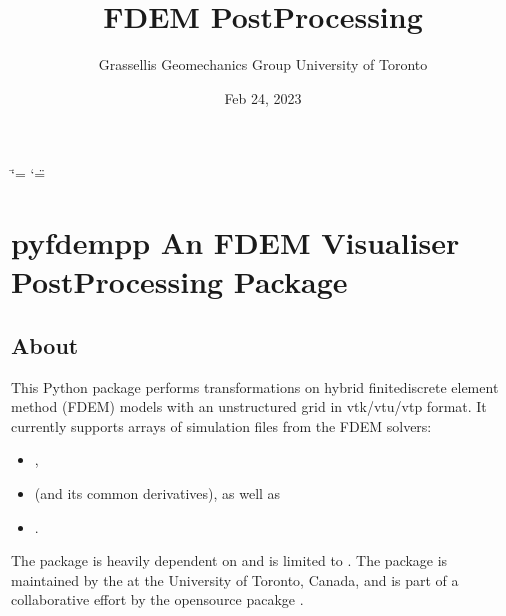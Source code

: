 \documentclass[letterpaper,10pt,english]{sphinxmanual}
\title{FDEM Post\sphinxhyphen{}Processing}
\date{Feb 24, 2023}
\author{Grasselli\textquotesingle{}s Geomechanics Group \sphinxhyphen{} University of Toronto}
\begin{document}
\ifdefined\shorthandoff
  \ifnum\catcode`\=\string=\active\shorthandoff{=}\fi
  \ifnum\catcode`\"=\active{}\fi
\fi

\pagestyle{empty}
\sphinxmaketitle
\pagestyle{plain}
\sphinxtableofcontents
\pagestyle{normal}
\label{\detokenize{index::doc}}


\sphinxstepscope


\chapter{pyfdempp \sphinxhyphen{} An FDEM Visualiser Post\sphinxhyphen{}Processing Package}
\label{\detokenize{postprocessing_intro:pyfdempp-an-fdem-visualiser-post-processing-package}}\label{\detokenize{postprocessing_intro::doc}}
\sphinxAtStartPar
{}


\section{About}
\label{\detokenize{postprocessing_intro:about}}
\sphinxAtStartPar
This Python package performs transformations on hybrid finite\sphinxhyphen{}discrete element method (FDEM) models with an unstructured grid in vtk/vtu/vtp format. It currently supports arrays of simulation files from the FDEM solvers:
\begin{itemize}
\item {} 
\sphinxAtStartPar
{},

\item {} 
\sphinxAtStartPar
{} (and its common derivatives), as well as

\item {} 
\sphinxAtStartPar
{}.

\end{itemize}

\sphinxAtStartPar
The package is heavily dependent on  and is limited to . The package is maintained by the  at the University of Toronto, Canada, and is part of a collaborative effort by the open\sphinxhyphen{}source pacakge .
\end{document}
